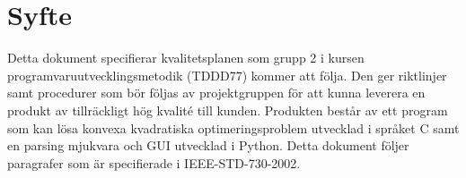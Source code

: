 \section{Syfte}
Detta dokument specifierar kvalitetsplanen som grupp 2 i kursen programvaruutvecklingsmetodik (TDDD77) kommer att följa. Den ger riktlinjer samt procedurer som bör följas av projektgruppen för att kunna leverera en produkt av tillräckligt hög kvalité till kunden. Produkten består av ett program som kan lösa konvexa kvadratiska optimeringsproblem utvecklad i språket C samt en parsing mjukvara och GUI utvecklad i Python. Detta dokument följer paragrafer som är specifierade i IEEE-STD-730-2002.